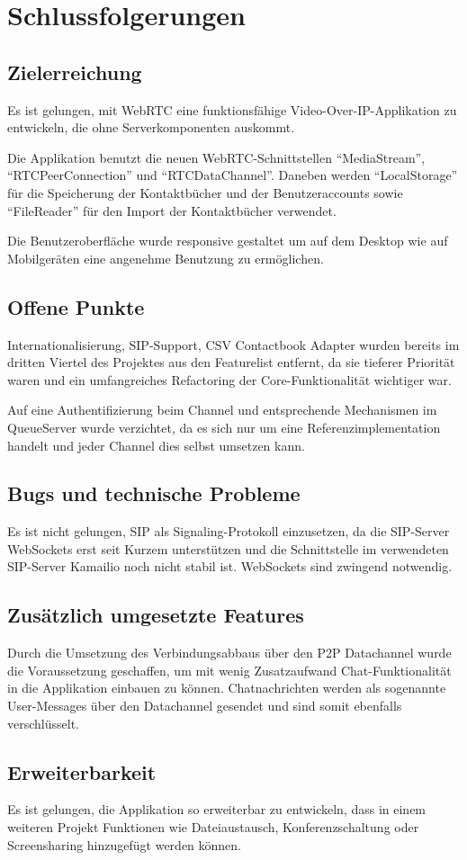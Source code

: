 \chapter{Schlussfolgerungen}
	\section{Zielerreichung}
		Es ist gelungen, mit WebRTC eine funktionsfähige Video-Over-IP-Applikation zu
		entwickeln, die ohne Serverkomponenten auskommt.
		
		Die Applikation benutzt die neuen WebRTC-Schnittstellen "`MediaStream"',
		"`RTCPeerConnection"' und "`RTCDataChannel"'. Daneben werden "`LocalStorage"' für die Speicherung der Kontaktbücher und der Benutzeraccounts sowie "`FileReader"' für den Import der Kontaktbücher verwendet.
		
		Die Benutzeroberfläche wurde responsive gestaltet um auf dem Desktop wie auf Mobilgeräten eine angenehme Benutzung zu ermöglichen.
	
	
	\section{Offene Punkte}
		Internationalisierung, SIP-Support, CSV Contactbook Adapter wurden bereits im
		dritten Viertel des Projektes aus den Featurelist entfernt, da sie tieferer Priorität waren und ein umfangreiches Refactoring der Core-Funktionalität wichtiger war.
		
		Auf eine Authentifizierung beim Channel und entsprechende Mechanismen im
		QueueServer wurde verzichtet, da es sich nur um eine Referenzimplementation
		handelt und jeder Channel dies selbst umsetzen kann.
		
	
	\section{Bugs und technische Probleme}
		Es ist nicht gelungen, SIP als Signaling-Protokoll einzusetzen, da die
		SIP-Server WebSockets erst seit Kurzem unterstützen und die Schnittstelle im
		verwendeten SIP-Server Kamailio noch nicht stabil ist. WebSockets sind
		zwingend notwendig.
		
	
	\section{Zusätzlich umgesetzte Features}
		Durch die Umsetzung des Verbindungsabbaus über den P2P Datachannel wurde die
		Voraussetzung geschaffen, um mit wenig Zusatzaufwand Chat-Funktionalität in die Applikation einbauen zu können.
		Chatnachrichten werden als sogenannte User-Messages über den Datachannel gesendet und sind somit ebenfalls verschlüsselt.
		
	
	\section{Erweiterbarkeit}
		Es ist gelungen, die Applikation so erweiterbar zu entwickeln, dass in einem
		weiteren Projekt Funktionen wie Dateiaustausch, Konferenzschaltung oder Screensharing hinzugefügt werden können.
